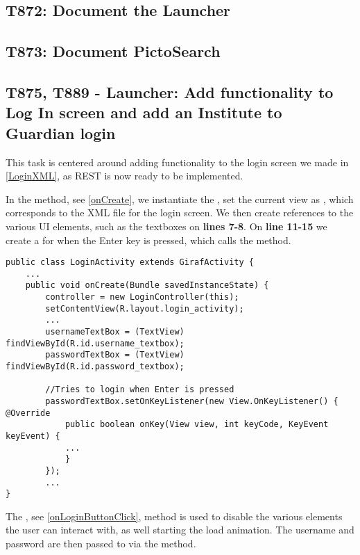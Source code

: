 \subsection{T872: Document the Launcher}

\subsection{T873: Document PictoSearch}

\subsection{T875, T889 - Launcher: Add functionality to Log In screen and add an
Institute to Guardian login}

This task is centered around adding functionality to the login screen we made
in \autoref{LoginXML}, as REST is now ready to be implemented.\nl

In the  method, see \autoref{onCreate}, we instantiate the
, set the current view as
, which corresponds to the XML file for the
login screen. We then create references to the various UI elements, such as the
textboxes on \textbf{lines 7-8}. On \textbf{line 11-15} we create a
 for when the Enter key is pressed, which calls the
 method.\nl

\begin{minipage}[H]{\linewidth}
\begin{lstlisting}[caption = ???, label = onCreate] 
public class LoginActivity extends GirafActivity {
	...
	public void onCreate(Bundle savedInstanceState) {
		controller = new LoginController(this);
    	setContentView(R.layout.login_activity);
		...
        usernameTextBox = (TextView) findViewById(R.id.username_textbox);
        passwordTextBox = (TextView) findViewById(R.id.password_textbox);
        
        //Tries to login when Enter is pressed
    	passwordTextBox.setOnKeyListener(new View.OnKeyListener() { @Override
            public boolean onKey(View view, int keyCode, KeyEvent keyEvent) {
            ...
            }
        });
        ...
}
\end{lstlisting}
\end{minipage}

The , see \autoref{onLoginButtonClick}, method is used
to disable the various elements the user can interact with, as well starting
the load animation. The username and password are then passed to
 via the  method.

